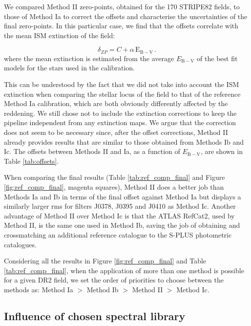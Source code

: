 \documentclass[fleqn,usenatbib]{mnras}
\begin{document}
We compared Method II zero-points, obtained for the 170 STRIPE82 fields, to those of Method Ia to correct the offsets and characterise the uncertainties of the final zero-points. In this particular case, we find that the offsets correlate with the mean ISM extinction of the field:

\begin{equation}
    \delta_{ZP} = C + \alpha \, \mathrm{E}_{\mathrm{B-V}} \,.
\end{equation}
where the mean extinction is estimated from the average $E_{\mathrm{B-V}}$ of the best fit models for the stars used in the calibration.

This can be understood by the fact that we did not take into account the ISM extinction when comparing the stellar locus of the field to that of the reference Method Ia calibration, which are both obviously differently affected by the reddening. We still chose not to include the extinction corrections to keep the pipeline independent from any extinction maps. We argue that the correction does not seem to be necessary since, after the offset corrections, Method II already provides results that are similar to those obtained from Methods Ib and Ic. The offsets between Methods II and Ia, as a function of $E_\mathrm{B-V}$, are shown in Table \ref{tab:offsets}.

When comparing the final results (Table \ref{tab:ref_comp_final} and Figure \ref{fig:ref_comp_final}, magenta squares), Method II does a better job than Methods Ia and Ib in terms of the final offset against Method Ia but displays a similarly larger rms for filters J0378, J0395 and J0410 as Method Ic. Another advantage of Method II over Method Ic is that the ATLAS RefCat2, used by Method II, is the same one used in Method Ib, saving the job of obtaining and crossmatching an additional reference catalogue to the S-PLUS photometric catalogues.

Considering all the results in Figure \ref{fig:ref_comp_final} and Table \ref{tab:ref_comp_final}, when the application of more than one method is possible for a given DR2 field, we set the order of priorities to choose between the methods as: Method Ia $>$ Method Ib $>$ Method II $>$ Method Ic.  



\subsection{Influence of chosen spectral library}
\label{sec:spectral_library_compaison}
\end{document}
